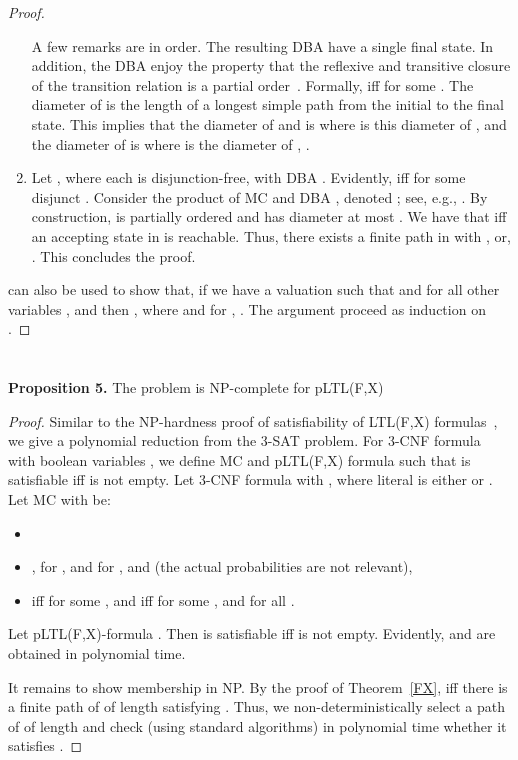 \documentclass{llncs}
\begin{document}
\begin{proof}
\begin{enumerate}
A few remarks are in order.
The resulting DBA have a single final state.
In addition, the DBA enjoy the property that the reflexive and transitive closure of the transition relation is a partial order~\cite{DBLP:journals/tocl/AlurT04}.
Formally,  iff  for some . 
The diameter of  is the length of a longest simple path from the initial to the final state.
This implies that
the diameter of  and   is  where  is this diameter of , and
the diameter of  is  where  is the diameter of , .
\item
Let , where each  is disjunction-free, with DBA .
Evidently,  iff  for some disjunct .
Consider the product of MC  and DBA , denoted ; see, e.g., \cite[Def.\ 10.50]{DBLP:books/daglib/0020348}.
By construction,  is partially ordered and has diameter at most .
We have that  iff an accepting state in  is reachable.
Thus, there exists a finite path  in  with , or, .
This concludes the proof. 
\end{enumerate}
 can also be used to show that, if we have a valuation  such that  and for all other variables ,  and 
 then , where  and for , . The argument proceed as induction on .
\hfill 
\end{proof}

\section{}
\textbf{Proposition 5.} The problem  is NP-complete for  pLTL(F,X)
\begin{proof}
 Similar to the NP-hardness proof of satisfiability of LTL(F,X) formulas~\cite[Th.\ 3.7]{SistlaClarke85}, we give a polynomial reduction from the 3-SAT problem.
For 3-CNF formula  with boolean variables , 
we define MC  and pLTL(F,X) formula   such that  is satisfiable iff   is not empty.
Let 3-CNF formula  with , 
where literal  is either  or .
Let MC  with  be:
\begin{itemize}
\item 

\item 
,  for ,  and  for , 
and  (the actual probabilities are not relevant), 
\item
 iff  for some , and  iff  for some , and
 for all .
\end{itemize}
Let pLTL(F,X)-formula . 
Then  is satisfiable iff  is not empty. Evidently,  and  are obtained in polynomial time.

It remains to show membership in NP.
By the proof of Theorem~\ref{FX},  iff there is a finite path of  of length  satisfying 
. 
Thus, we non-deterministically select a path of  of length  and check (using standard algorithms) in polynomial time whether 
it satisfies .  \hfill 
\end{proof}
\end{document}
